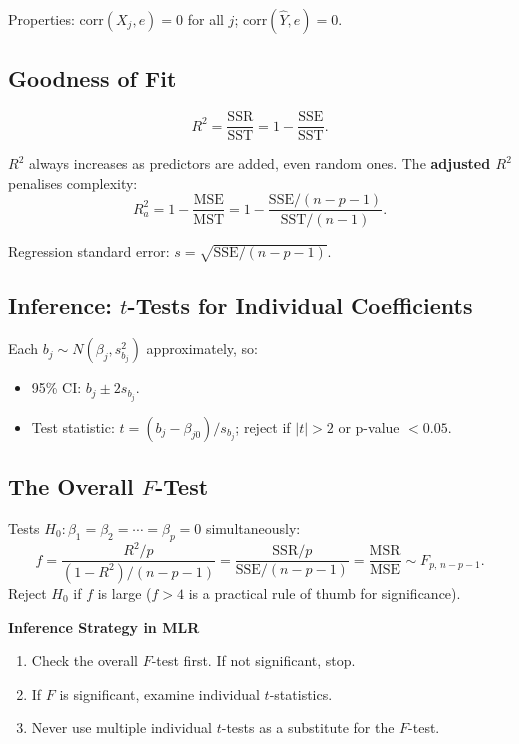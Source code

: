 \documentclass[12pt, a4paper]{article}
\begin{document}
Properties: $\text{corr}(X_j, e) = 0$ for all $j$; $\text{corr}(\hat{Y}, e) = 0$.

\subsection{Goodness of Fit}

\[
  R^2 = \frac{\text{SSR}}{\text{SST}} = 1 - \frac{\text{SSE}}{\text{SST}}.
\]

$R^2$ always increases as predictors are added, even random ones. The \textbf{adjusted $R^2$} penalises complexity:
\[
  R_a^2 = 1 - \frac{\text{MSE}}{\text{MST}} = 1 - \frac{\text{SSE}/(n-p-1)}{\text{SST}/(n-1)}.
\]

Regression standard error: $s = \sqrt{\text{SSE}/(n-p-1)}$.

\subsection{Inference: $t$-Tests for Individual Coefficients}

Each $b_j \sim N(\beta_j, s_{b_j}^2)$ approximately, so:
\begin{itemize}
  \item 95\% CI: $b_j \pm 2 s_{b_j}$.
  \item Test statistic: $t = (b_j - \beta_{j0})/s_{b_j}$; reject if $|t| > 2$ or p-value $< 0.05$.
\end{itemize}

\subsection{The Overall $F$-Test}

Tests $H_0: \beta_1 = \beta_2 = \cdots = \beta_p = 0$ simultaneously:
\[
  f = \frac{R^2/p}{(1-R^2)/(n-p-1)} = \frac{\text{SSR}/p}{\text{SSE}/(n-p-1)} = \frac{\text{MSR}}{\text{MSE}} \sim F_{p,\,n-p-1}.
\]
Reject $H_0$ if $f$ is large ($f > 4$ is a practical rule of thumb for significance).

\begin{keybox}
\noindent\textbf{Inference Strategy in MLR}\par\smallskip
\begin{enumerate}
  \item Check the overall $F$-test first. If not significant, stop.
  \item If $F$ is significant, examine individual $t$-statistics.
  \item Never use multiple individual $t$-tests as a substitute for the $F$-test.
\end{enumerate}
\end{keybox}
\end{document}
